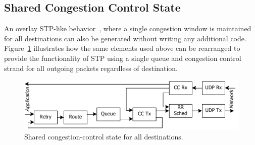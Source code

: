 

\subsection{Shared Congestion Control State}

An overlay STP-like behavior~\cite{dabek_nsdi04}, where a single
congestion window is maintained for all destinations can also be
generated without writing any additional code.  Figure~\ref{fig:STP}
illustrates how the same elements used above can be rearranged to
provide the functionality of STP using a single queue and congestion
control strand for all outgoing packets regardless of destination.

\begin{figure}
\centerline{\includegraphics{figures/STP}}
\caption{Shared congestion-control state for all destinations.}
\label{fig:STP}
\end{figure}

